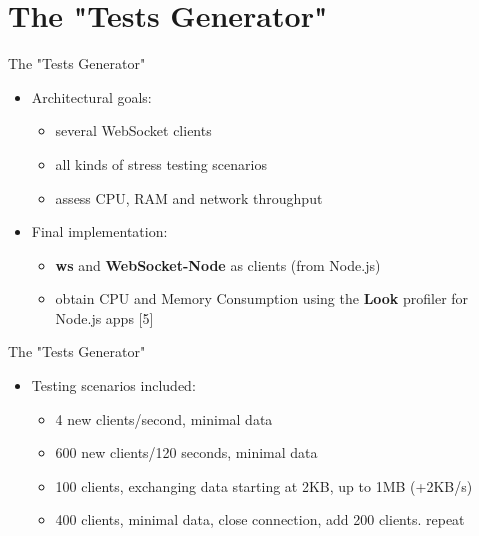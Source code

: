 \documentclass{soa.cs.pub.ro}
\begin{document}
\section{The "Tests Generator"}

\begin{frame}{The "Tests Generator"}
  \begin{itemize}
    \item Architectural goals:
      \begin{itemize}
        \item several WebSocket clients
        \item all kinds of stress testing scenarios
        \item assess CPU, RAM and network throughput
      \end{itemize}
    \item Final implementation:
      \begin{itemize}
        \item \textbf{ws} and \textbf{WebSocket-Node} as clients (from Node.js)
        \item obtain CPU and Memory Consumption using the \textbf{Look}
              profiler for Node.js apps [5]
      \end{itemize}
  \end{itemize}
\end{frame}

\begin{frame}{The "Tests Generator"}
  \begin{itemize}
    \item Testing scenarios included:
      \begin{itemize}
        \item 4 new clients/second, minimal data
        \item 600 new clients/120 seconds, minimal data
        \item 100 clients, exchanging data starting at 2KB, up to 1MB (+2KB/s)
        \item 400 clients, minimal data, close connection,
              add 200 clients. repeat
      \end{itemize}
  \end{itemize}
\end{frame}
\end{document}
